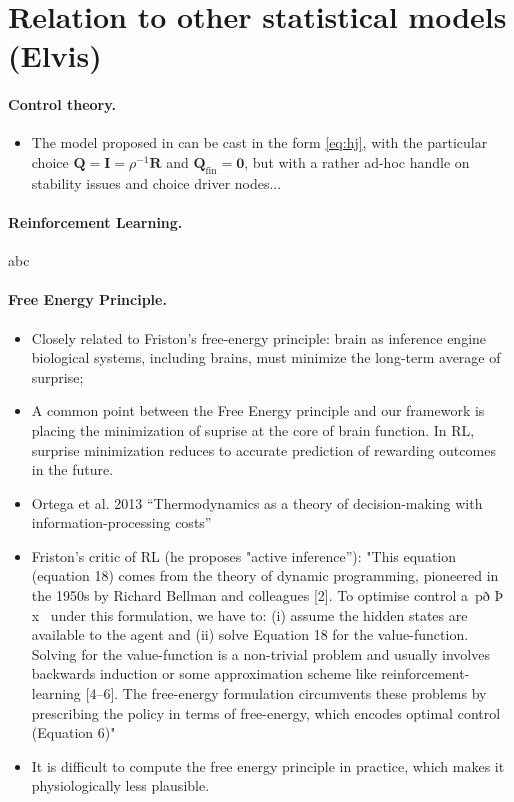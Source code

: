\documentclass{article} %
\newcommand{\R}{\mathbb{R}}
\def\R{\mathbf{R}}
\def\Q{\mathbf{Q}}
\begin{document}
\section{Relation to other statistical models (Elvis)}
\paragraph{Control theory.}
\begin{itemize}
  \item The model proposed in \cite{betzel2016} can be cast in the form \eqref{eq:hj}, with the particular choice $\Q = \textbf{I} = \rho^{-1}\R$ and $\Q_{\text{fin}} = \textbf{0}$, but with a rather ad-hoc handle on stability issues and choice driver nodes...
\end{itemize}

\paragraph{Reinforcement Learning.}
abc

\paragraph{Free Energy Principle.}
\begin{itemize}
  \item Closely related to Friston's free-energy principle: brain as inference engine
  biological systems, including brains, must minimize the long-term average of surprise;
  \item A common point between the Free Energy principle and our framework
  is placing the minimization of suprise at the core of brain function.
  In RL, surprise minimization reduces to accurate prediction of 
  rewarding outcomes in the future.
  \item Ortega et al. 2013 \cite{ortega2013thermodynamics} ``Thermodynamics as a theory of decision-making with information-processing costs''
\item Friston's critic of RL \cite{fristonAIorRL} (he proposes "active inference''): "This equation (equation 18) comes from the theory of dynamic programming,
pioneered in the 1950s by Richard Bellman and colleagues [2]. To
optimise control a~pð Þ x~ under this formulation, we have to: (i)
assume the hidden states are available to the agent and (ii) solve
Equation 18 for the value-function. Solving for the value-function
is a non-trivial problem and usually involves backwards induction
or some approximation scheme like reinforcement-learning [4–6].
The free-energy formulation circumvents these problems by
prescribing the policy in terms of free-energy, which encodes
optimal control (Equation 6)"
\item It is difficult to compute the free energy principle
in practice, which makes it physiologically less plausible.
  \end{itemize}
\end{document}
